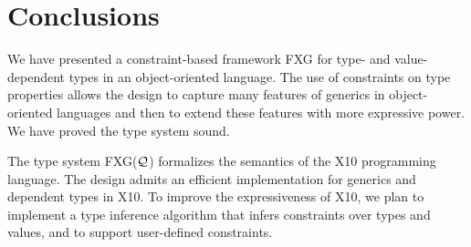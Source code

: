 \documentclass[preprint,nocopyrightspace,9pt]{sigplanconf}
\newcommand\Xten{{\sf X10}\xspace}
\newcommand\FXGL[1]{{\sf FXG(${\cal #1}$)}}
\def\FXG{{\sf FXG}\xspace}
\begin{document}
\section{Conclusions}
\label{sec:conclusions}

We have presented a constraint-based framework \FXG{} for type-
and value-dependent types in an object-oriented language.
%
The use of constraints on type properties allows the design to
capture many features of generics in object-oriented languages
and then to extend these features with more
expressive power.  We have proved the type system sound.

The type system \FXGL{Q} formalizes the semantics of the \Xten{}
programming language.  The design admits an efficient
implementation for generics and dependent types in \Xten{}.
To improve the expressiveness of \Xten{}, we plan to implement
a type inference algorithm that infers constraints over types
and values, and to support user-defined constraints.







% 
\end{document}

